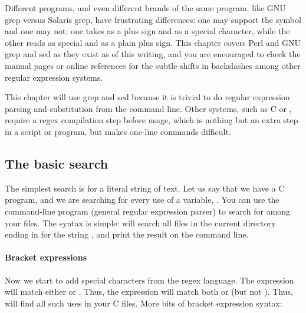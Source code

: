 Different programs, and even different brands of the same
program, like GNU grep versus Solaris grep, have frustrating
differences: one may support the  symbol and one may not; 
one takes \ci{+} as a plus sign and  \ci{\textbs+} as a special
character, while the other reads \ci{+} as special and \ci{\textbs+}
as a plain plus sign. This chapter covers Perl and GNU grep and sed as they exist as
of this writing, and you are encouraged to check the manual pages or
online references for the subtle shifts in backslashes among other
regular expression systems.


This chapter will use grep and sed because it is trivial to do regular
expression parsing and substitution from the command line. Other
systems, such as C or , require a regex compilation step
before usage, which is nothing but an extra step in a script or program,
but makes one-line commands difficult. 

\subsection{The basic search}
The simplest search is for a literal string of text. Let us say that we
have a C program, and we are searching for every use of a variable,
. You can use the command-line program  (general
regular expression parser) to search for  among your files. The
syntax is simple:  will search all files in the current
directory ending in  for the string , and print the result
on the command line.



\paragraph{Bracket expressions} Now we start to add special characters
from the regex language. The expression \ci{[fs]} will match either
 or . Thus, the expression  will match both
 or  (but not ). Thus,  will find all such uses in your C files. More bits of
bracket expression syntax:

